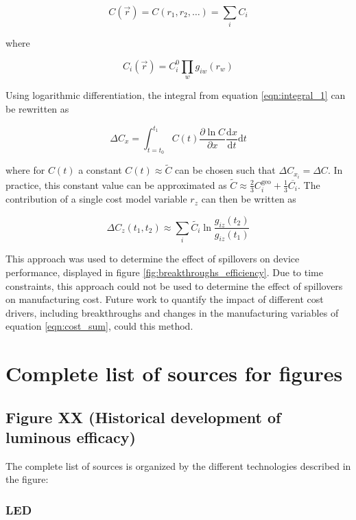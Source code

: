 \documentclass{article}
\begin{document}
\begin{equation}
C(\vec{r}) = C(r_1,r_2, \dots) = \sum_i C_i
\end{equation}

where

\begin{equation}
C_i(\vec{r}) = C_i^0 \prod_w g_{iw}(r_w)
\end{equation}

Using logarithmic differentiation, the integral from equation \ref{eqn:integral_1} can be rewritten as

\begin{equation}
\Delta C_x = \int_{t=t_0}^{t_1} C(t) \frac{ \partial \ln C }{ \partial x } \frac{ \text{d} x }{ \text{d} t} \text{d} t
\end{equation}

where for $C(t)$ a constant $C(t) \approx \tilde{C} $ can be chosen such that $\Delta C_{x_i} = \Delta C$. In practice, this constant value can be approximated as $\tilde{C} \approx \frac{2}{3} C_i^\text{geo} + \frac{1}{3} \overline{C_i}$. The contribution of a single cost model variable $r_z$ can then be written as

\begin{equation}
\Delta C_z (t_1,t_2) \approx \sum_i \tilde{C_i} \ln \frac{g_{iz}(t_2)}{g_{iz}(t_1)}
\end{equation}

This approach was used to determine the effect of spillovers on device performance, displayed in figure \ref{fig:breakthroughs_efficiency}. Due to time constraints, this approach could not be used to determine the effect of spillovers on manufacturing cost. Future work to quantify the impact of different cost drivers, including breakthroughs and changes in the manufacturing variables of equation \ref{eqn:cost_sum}, could this method.

\newpage
\section{Complete list of sources for figures}

\subsection{Figure XX (Historical development of luminous efficacy)}

The complete list of sources is organized by the different technologies described in the figure:

\subsubsection{LED}
\end{document}
